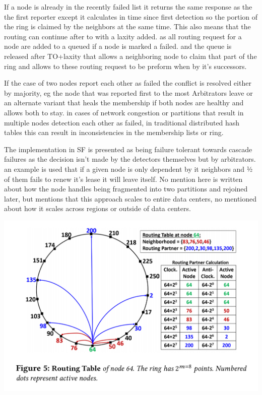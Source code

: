 \documentclass[a4paper,10pt,titlepage]{report}
\begin{document}
    If a node is already in the recently failed list it returns the same response as the the first reporter except it calculates in time since first detection so the portion of the ring is claimed by the neighbors at the same time. This also means that the routing can continue after to with a laxity added. as all routing request for a node are added to a queued if a node is marked a failed. and the queue is released after TO+laxity that allows a neighboring node to claim that part of the ring and allows to these routing request to be preform when by it's successors.\\
    \vspace{5mm}

    If the case of two nodes report each other as failed the conflict is resolved either by majority, eg the node that was reported first to the most Arbitrators leave or an alternate variant that heals the membership if both nodes are healthy and allows both to stay. in cases of network congestion or partitions that result in multiple nodes detection each other as failed, in traditional distributed hash tables this can result in inconsistencies in the membership lists or ring. \\
    \vspace{5mm}

    The implementation in SF is presented as being failure tolerant towards cascade failures as the decision isn't made by the detectors themselves but by arbitrators. an example is used that if a given node is only dependent by it neighbors and ½ of them fails to renew it's lease it will leave itself. No mention here is written about how the node handles being fragmented into two partitions and rejoined later, but mentions that this approach scales to entire data centers, no mentioned about how it scales across regions or outside of data centers.\\
    \vspace{5mm}

    \includegraphics[scale=0.3]{images/servicefabric-fig-ring-topology.jpeg}
\end{document}
